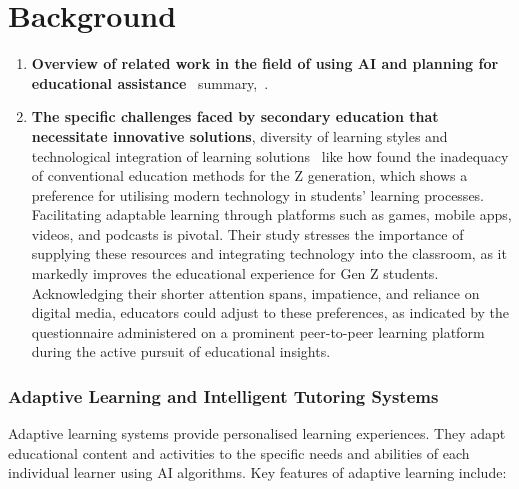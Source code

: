 \section{Background}
\begin{enumerate}
    \item \textbf{Overview of related work in the field of using AI and planning for educational assistance}~\citet{Castillo2009} summary,~\cite{Ouyang2023}.
    \item \textbf{The specific challenges faced by secondary education that necessitate innovative solutions}, diversity of learning styles and technological integration of learning solutions \textemdash~like how \citet{Szymkowiak2021} found the inadequacy of conventional education methods for the Z generation, which shows a preference for utilising modern technology in students' learning processes. Facilitating adaptable learning through platforms such as games, mobile apps, videos, and podcasts is pivotal. Their study stresses the importance of supplying these resources and integrating technology into the classroom, as it markedly improves the educational experience for Gen Z students. Acknowledging their shorter attention spans, impatience, and reliance on digital media, educators could adjust to these preferences, as indicated by the questionnaire administered on a prominent peer-to-peer learning platform during the active pursuit of educational insights.
\end{enumerate}

\subsubsection{Adaptive Learning and Intelligent Tutoring Systems} Adaptive learning systems provide personalised learning experiences. They adapt educational content and activities to the specific needs and abilities of each individual learner using AI algorithms. Key features of adaptive learning include:


